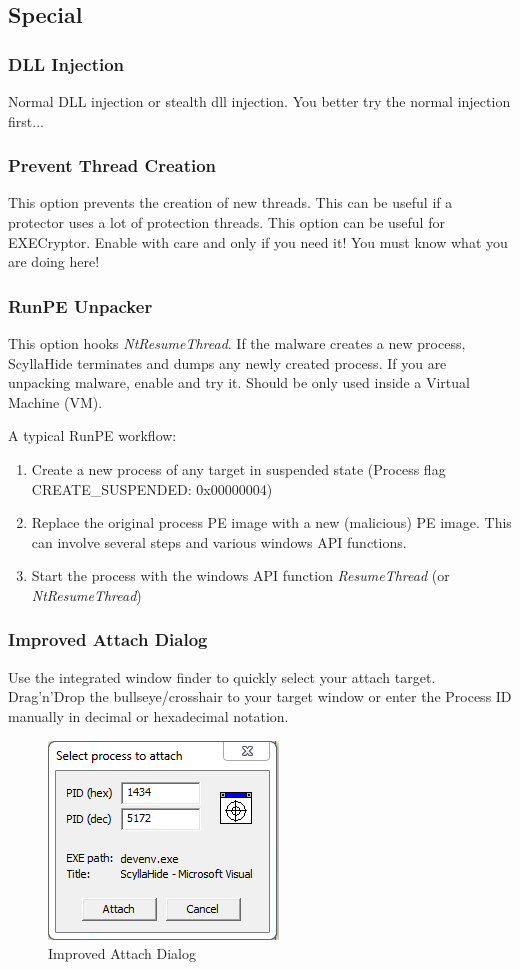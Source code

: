 \documentclass[10pt,a4paper]{article}
\begin{document}
\subsection{Special}
\subsubsection{DLL Injection}
Normal DLL injection or stealth dll injection. You better try the normal injection first...

\subsubsection{Prevent Thread Creation}
This option prevents the creation of new threads. This can be useful if a protector uses a lot of protection threads. This option can be useful for EXECryptor. Enable with care and only if you need it! You must know what you are doing here!

\subsubsection{RunPE Unpacker}
This option hooks \textit{NtResumeThread}. If the malware creates a new process, ScyllaHide terminates and dumps any newly created process. If you are unpacking malware, enable and try it. Should be only used inside a Virtual Machine (VM).

A typical RunPE workflow:

\begin{enumerate}
\item Create a new process of any target in suspended state (Process flag CREATE\_SUSPENDED: 0x00000004)
\item Replace the original process PE image with a new (malicious) PE image. This can involve several steps and various windows API functions.
\item Start the process with the windows API function \textit{ResumeThread} (or \textit{NtResumeThread})
\end{enumerate}

\subsubsection{Improved Attach Dialog}
Use the integrated window finder to quickly select your attach target. Drag'n'Drop the bullseye/crosshair to your target window or enter the Process ID manually in decimal or hexadecimal notation.
\begin{figure}[H]
\centering
\includegraphics[scale=0.8]{newattachdialog.PNG}
\caption{Improved Attach Dialog}
\end{figure}
\end{document}
